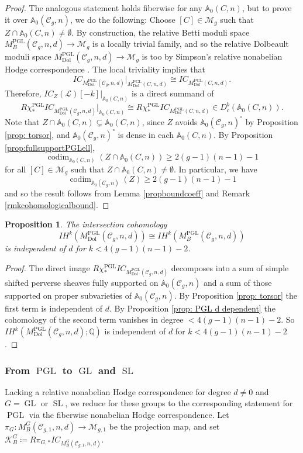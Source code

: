 \documentclass[11pt,reqno]{amsart}
\theoremstyle{plain} %
\newtheorem{prop}[theorem]{Proposition}
\theoremstyle{definition}
\newcommand{\QQ}{\mathbb{Q}}
\newcommand{\M}{\mathcal{M}}
\newcommand{\C}{\mathcal{C}}
\DeclareMathOperator{\GL}{GL}
\DeclareMathOperator{\SL}{SL}
\DeclareMathOperator{\PGL}{PGL}
\newcommand{\Dol}{\mathrm{Dol}}
\newcommand{\IH}{I\!H}
\newcommand{\IC}{IC}
\renewcommand{\AA}{\mathbb{A}}
\DeclareMathOperator{\codim}{codim}
\begin{document}
\begin{proof}
The analogous statement holds fiberwise for any $\AA_0(C,n)$, but to prove it over $\AA_0(\C_g,n)$, we do the following: Choose $[C] \in \M_g$ such that $Z \cap \AA_0(C, n)\neq \emptyset$. By construction, the relative Betti moduli space $M^{\PGL}_{B}(\C_g,n,d) \to \M_g$ is a locally trivial family, and so the relative Dolbeault moduli space $M^{\PGL}_{\Dol}(\C_g,n,d) \to \M_g$ is too by Simpson's relative nonabelian Hodge correspondence \cite[Theorem 9.11, Lemma 9.14]{Simpson-reps2}. The local triviality implies that
\[\IC_{M^{\PGL}_{\Dol}(\C_g,n,d)}|_{M^{\PGL}_{\Dol}(C,n,d)} \cong \IC_{M^{\PGL}_{\Dol}(C,n,d)}.\]
Therefore, $\IC_{Z}(\mathcal{L})[-k]|_{\AA_0(C,n)}$ is a direct summand of 
\[
R\chi^{\PGL}_* \IC_{M^{\PGL}_{\Dol}(\C_g,n,d)}|_{\AA_{0}(C, n)} \cong R\chi^{\PGL}_* \IC_{M^{\PGL}_{\Dol}(C,n,d)} \in D^b_c(\AA_0(C,n)).
\]
Note that $Z \cap \AA_0(C, n) \subsetneq \AA_0(C, n)$, since $Z$ avoids $\AA_0(\C_g, n)^\circ$ by Proposition \ref{prop: torsor}, and $\AA_0(\C_g, n)^\circ$ is dense in each $\AA_0(C, n)$. By Proposition \ref{prop:fullsupportPGLell}, \[\codim_{\AA_0(C, n)}(Z \cap \AA_0(C, n))\geq 2(g-1)(n-1)-1\] for all $[C] \in \M_g$ such that $Z \cap \AA_0(C, n)\neq \emptyset$. In particular, we have
\[\codim_{\AA_0(\mathcal{C}_g, n)}(Z)\geq 2(g-1)(n-1)-1\] and so the result follows from Lemma \ref{propboundcoeff} and Remark \ref{rmkcohomologicalbound}.
\end{proof}

\begin{prop} \label{prop: PGL result} The intersection cohomology
    $$\IH^{k}(M^{\PGL}_{\Dol}(\C_g,n,d))
    \cong \IH^{k}(M^{\PGL}_{B}(\C_g,n,d))$$ is independent of $d$ for $k< 4(g-1)(n-1)-2$.
\end{prop}

\begin{proof}
    The direct image $R\chi_*^{\PGL} \IC_{M_{\Dol}^{\PGL}(\C_g,n,d)}$ decomposes into a sum of simple shifted perverse sheaves fully supported on $\AA_0(\C_g,n)$ and a sum of those supported on proper subvarieties of $\AA_0(\C_g,n)$. By Proposition \ref{prop: torsor} the first term is independent of $d$. By Proposition \ref{prop: PGL d dependent} the cohomology of the second term vanishes in degree $<  4(g-1)(n-1)-2$. So $\IH^k(M^{\PGL}_{\Dol}(\C_g,n,d); \QQ)$ is independent of $d$ for $k <  4(g-1)(n-1)-2$.
\end{proof}


\subsubsection{From $\PGL$ to $\GL$ and $\SL$}
Lacking a relative  nonabelian Hodge correspondence for degree $d \ne 0$ and $G = \GL$ or $\SL$, we reduce  for these groups to the corresponding statement for $\PGL$ via the fiberwise nonabelian Hodge correspondence. Let $\pi_G\colon M^G_B(\C_{g,1},n,d) \to \M_{g,1}$ be the projection map, and set $\mathcal{K}^{G}_{B} \coloneqq R\pi_{G, *} \IC_{M^G_{B}(\C_{g,1},n,d)}$.
\end{document}
